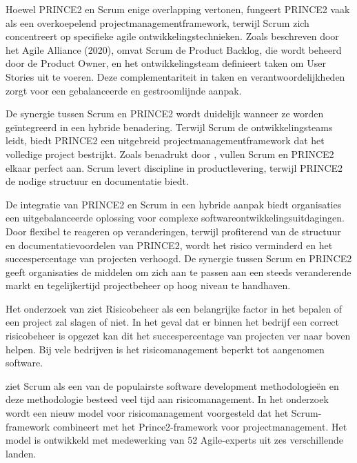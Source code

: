 \documentclass[dutch]{hogent-article}
\begin{document}
Hoewel PRINCE2 en Scrum enige overlapping vertonen, fungeert PRINCE2 vaak als een overkoepelend projectmanagementframework, terwijl Scrum zich concentreert op specifieke agile ontwikkelingstechnieken. Zoals beschreven door het Agile Alliance (2020), omvat Scrum de Product Backlog, die wordt beheerd door de Product Owner, en het ontwikkelingsteam definieert taken om User Stories uit te voeren. Deze complementariteit in taken en verantwoordelijkheden zorgt voor een gebalanceerde en gestroomlijnde aanpak.
\newline

De synergie tussen Scrum en PRINCE2 wordt duidelijk wanneer ze worden geïntegreerd in een hybride benadering. Terwijl Scrum de ontwikkelingsteams leidt, biedt PRINCE2 een uitgebreid projectmanagementframework dat het volledige project bestrijkt. Zoals benadrukt door \textcite{PoniszewskaMaranda2022}, vullen Scrum en PRINCE2 elkaar perfect aan. Scrum levert discipline in productlevering, terwijl PRINCE2 de nodige structuur en documentatie biedt.
\newline

De integratie van PRINCE2 en Scrum in een hybride aanpak biedt organisaties een uitgebalanceerde oplossing voor complexe softwareontwikkelingsuitdagingen. Door flexibel te reageren op veranderingen, terwijl profiterend van de structuur en documentatievoordelen van PRINCE2, wordt het risico verminderd en het succespercentage van projecten verhoogd. De synergie tussen Scrum en PRINCE2 geeft organisaties de middelen om zich aan te passen aan een steeds veranderende markt en tegelijkertijd projectbeheer op hoog niveau te handhaven.
\newline

Het onderzoek van \textcite{Mousaei2018} ziet Risicobeheer als een belangrijke factor in het bepalen of een project zal slagen of niet. In het geval dat er binnen het bedrijf een correct risicobeheer is opgezet kan dit het succespercentage van projecten ver naar boven helpen. Bij vele bedrijven is het risicomanagement beperkt tot aangenomen software.
\newline 

\textcite{Mousaei2018} ziet Scrum als een van de populairste software development methodologieën en deze methodologie besteed veel tijd aan risicomanagement. In het onderzoek wordt een nieuw model voor risicomanagement voorgesteld dat het Scrum-framework combineert met het Prince2-framework voor projectmanagement. Het model is ontwikkeld met medewerking van 52 Agile-experts uit zes verschillende landen.
\newline
\end{document}
